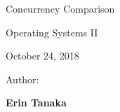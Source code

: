 \begin{titlepage}
\label{titlepage}
    \begin{singlespace}
		\hfill  
        \par\vspace{.2in}
        \centering
        \scshape{
            \vspace{.3in}
            \Huge{Concurrency Comparison}\par  %
            \vspace{.3in}
            \large Operating Systems II\par
            \vspace{.1in}
            \large October 24, 2018\par
            \vspace{.5in}
            \Large Author:\par\vspace{.1in} 
            \textbf{\LARGE Erin Tanaka}\par\vspace{.07in} 
            \vspace{1.4in}
            \par
        }
    \end{singlespace}
            

\end{titlepage}
